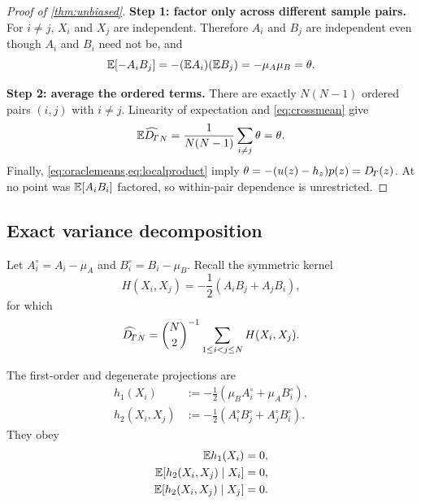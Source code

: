 \begin{proof}[Proof of \cref{thm:unbiased}]
\textbf{Step 1: factor only across different sample pairs.}
For $i\ne j$, $X_i$ and $X_j$ are independent.  Therefore $A_i$ and $B_j$ are
independent even though $A_i$ and $B_i$ need not be, and
\begin{equation}
 \mathbb{E}[-A_iB_j]=-(\mathbb{E} A_i)(\mathbb{E} B_j)=-\mu_A\mu_B=\theta.
 \label{eq:crossmean}
\end{equation}

\textbf{Step 2: average the ordered terms.}
There are exactly $N(N-1)$ ordered pairs $(i,j)$ with $i\ne j$.  Linearity of
expectation and \cref{eq:crossmean} give
\begin{equation}
 \mathbb{E}\widehat{D_{\!T}}_N
 =\frac{1}{N(N-1)}\sum_{i\ne j}\theta=\theta.
\end{equation}
Finally, \cref{eq:oraclemeans,eq:localproduct} imply
$\theta=-(u(z)-h_z)p(z)=D_{\!T}(z)$.  At no point was
$\mathbb{E}[A_iB_i]$ factored, so within-pair dependence is unrestricted.
\end{proof}

\subsection{Exact variance decomposition}

Let $A_i^\circ=A_i-\mu_A$ and $B_i^\circ=B_i-\mu_B$.  Recall the symmetric
kernel
\begin{equation}
 H(X_i,X_j)=-\frac12(A_iB_j+A_jB_i),
\end{equation}
for which
\begin{equation}
 \widehat{D_{\!T}}_N
 =\binom N2^{-1}\sum_{1\le i<j\le N}H(X_i,X_j).
 \label{eq:ustatunordered}
\end{equation}

\begin{lemma}
\label{lem:projections}
The first-order and degenerate projections are
\begin{align}
 h_1(X_i)
 &:=-\frac12\left(\mu_BA_i^\circ+\mu_AB_i^\circ\right),
 \label{eq:hprojectionone}\\
 h_2(X_i,X_j)
 &:=-\frac12\left(A_i^\circ B_j^\circ
                  +A_j^\circ B_i^\circ\right).
 \label{eq:hprojectiontwo}
\end{align}
They obey
\begin{align}
 \mathbb{E} h_1(X_i)&=0,\notag\\
 \mathbb{E}[h_2(X_i,X_j)\mid X_i]&=0,\notag\\
 \mathbb{E}[h_2(X_i,X_j)\mid X_j]&=0.
 \label{eq:degeneracy}
\end{align}
\end{lemma}

